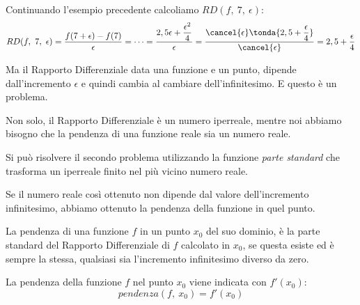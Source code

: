 Continuando l'esempio precedente calcoliamo \(RD(f,~7,~\epsilon)\):
\[RD(f,~7,~\epsilon) =
 \frac{f(7+\epsilon) - f(7)}{\epsilon}=\dots=
 \frac{2,5 \epsilon + \dfrac{\epsilon^2}{4}}{\epsilon}=
 \frac{\cancel{\epsilon}\tonda{2,5 + \dfrac{\epsilon}{4}}}
 {\cancel{\epsilon}}=
 2,5 + \frac{\epsilon}{4}
\]

Ma il Rapporto Differenziale data una funzione e un punto, dipende 
dall'incremento \(\epsilon\) e quindi cambia al cambiare dell'infinitesimo. 
E questo è un problema. 

Non solo, il Rapporto Differenziale è un numero iperreale, mentre noi 
abbiamo bisogno che la pendenza di una funzione reale sia un numero reale.

Si può risolvere il secondo problema utilizzando la funzione 
\emph{parte standard} che trasforma un iperreale finito nel più vicino
numero reale.

Se il numero reale così ottenuto non dipende dal valore dell'incremento 
infinitesimo, abbiamo ottenuto la pendenza della funzione in quel punto.

% 
\begin{definizione}
La pendenza di una funzione \(f\) in un punto \(x_0\) del suo dominio, è la 
parte standard del Rapporto Differenziale di \(f\) calcolato in \(x_0\), se 
questa esiste ed è sempre la stessa, qualsiasi sia l'incremento infinitesimo 
diverso da zero.
\end{definizione}

La pendenza della funzione \(f\) nel punto \(x_0\) viene indicata con 
\(f'(x_0)\):
\[pendenza(f,~x_0) = f'(x_0)\]


